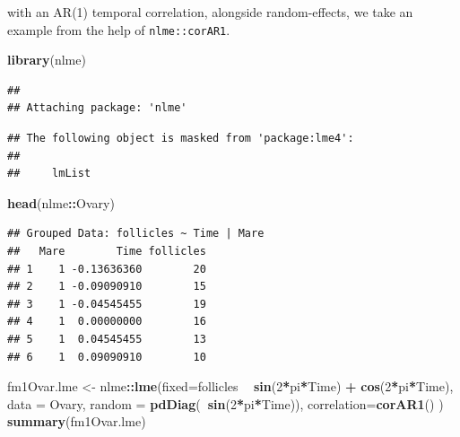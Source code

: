\documentclass[]{book}
\newenvironment{Shaded}{\begin{snugshade}}{\end{snugshade}}
\newcommand{\DataTypeTok}[1]{\textcolor[rgb]{0.13,0.29,0.53}{#1}}
\newcommand{\DecValTok}[1]{\textcolor[rgb]{0.00,0.00,0.81}{#1}}
\newcommand{\KeywordTok}[1]{\textcolor[rgb]{0.13,0.29,0.53}{\textbf{#1}}}
\newcommand{\NormalTok}[1]{#1}
\newcommand{\OperatorTok}[1]{\textcolor[rgb]{0.81,0.36,0.00}{\textbf{#1}}}
\newcommand{\StringTok}[1]{\textcolor[rgb]{0.31,0.60,0.02}{#1}}
\theoremstyle{definition}
\theoremstyle{definition}
\theoremstyle{definition}
\theoremstyle{remark}
\begin{document}
with an AR(1) temporal correlation, alongside random-effects, we take an example from the help of \texttt{nlme::corAR1}.

\begin{Shaded}
\begin{Highlighting}[]
\KeywordTok{library}\NormalTok{(nlme)}
\end{Highlighting}
\end{Shaded}

\begin{verbatim}
## 
## Attaching package: 'nlme'
\end{verbatim}

\begin{verbatim}
## The following object is masked from 'package:lme4':
## 
##     lmList
\end{verbatim}

\begin{Shaded}
\begin{Highlighting}[]
\KeywordTok{head}\NormalTok{(nlme}\OperatorTok{::}\NormalTok{Ovary)}
\end{Highlighting}
\end{Shaded}

\begin{verbatim}
## Grouped Data: follicles ~ Time | Mare
##   Mare        Time follicles
## 1    1 -0.13636360        20
## 2    1 -0.09090910        15
## 3    1 -0.04545455        19
## 4    1  0.00000000        16
## 5    1  0.04545455        13
## 6    1  0.09090910        10
\end{verbatim}

\begin{Shaded}
\begin{Highlighting}[]
\NormalTok{fm1Ovar.lme <-}\StringTok{ }\NormalTok{nlme}\OperatorTok{::}\KeywordTok{lme}\NormalTok{(}\DataTypeTok{fixed=}\NormalTok{follicles }\OperatorTok{~}\StringTok{ }\KeywordTok{sin}\NormalTok{(}\DecValTok{2}\OperatorTok{*}\NormalTok{pi}\OperatorTok{*}\NormalTok{Time) }\OperatorTok{+}\StringTok{ }\KeywordTok{cos}\NormalTok{(}\DecValTok{2}\OperatorTok{*}\NormalTok{pi}\OperatorTok{*}\NormalTok{Time), }
                   \DataTypeTok{data =}\NormalTok{ Ovary, }
                   \DataTypeTok{random =} \KeywordTok{pdDiag}\NormalTok{(}\OperatorTok{~}\KeywordTok{sin}\NormalTok{(}\DecValTok{2}\OperatorTok{*}\NormalTok{pi}\OperatorTok{*}\NormalTok{Time)), }
                   \DataTypeTok{correlation=}\KeywordTok{corAR1}\NormalTok{() )}
\KeywordTok{summary}\NormalTok{(fm1Ovar.lme)}
\end{Highlighting}
\end{Shaded}
\end{document}
